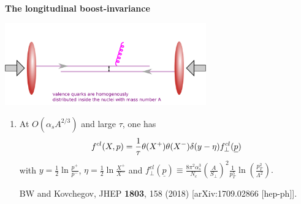 \documentclass[9pt,a4paper,unknownkeysallowed,xcolor=dvipsnames,aspectratio=43]{beamer}
\begin{document}
%
\begin{frame}{\bf\huge The longitudinal boost-invariance}	\vspace{2mm}
\begin{center}
\includegraphics[width=0.65\textwidth]{fig/classical}\\
\end{center}
\begin{enumerate}
\item{\large At $O(\alpha_s A^{2/3})$ and large $\tau$, one has}
\begin{align}
  f^{cl}(X,p)=\frac{1}{\tau} \theta(X^+) \theta(X^-) \delta(y-\eta)
  f_\perp^{cl}(\underline{p})
  \notag
\end{align}
with $y = \frac{1}{2}\ln\frac{p^+}{p^-}$, $\eta = \frac{1}{2}\ln\frac{X^+}{X^-}$ and
$f_\perp^{cl}(\underline{p})\equiv\frac{8\pi^2\alpha_s^3}{N_c}\left(\frac{A}{S_\perp}\right)^2
  \frac{1}{p_T^5}\ln\left(\frac{p_T^2}{\Lambda^2}\right).$
\begin{center}
    {\tiny  {\color{teablue}
  BW and Kovchegov,
  JHEP {\bf 1803}, 158 (2018)
  [arXiv:1709.02866 [hep-ph]].
}}
\end{center}

\end{enumerate}
\end{frame}
\end{document}
